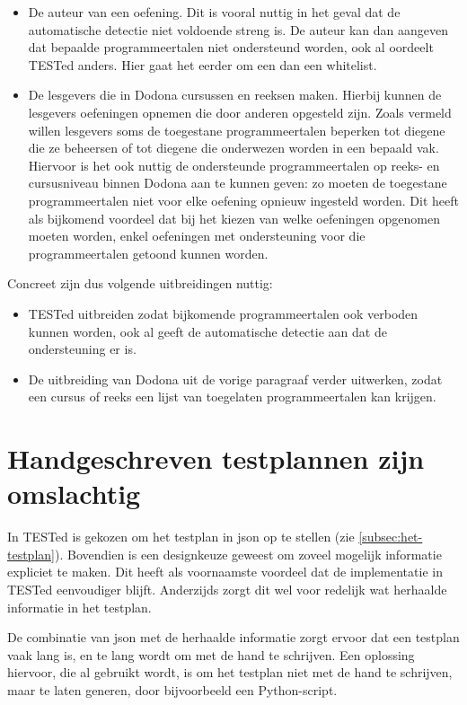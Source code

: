 \begin{itemize}
    \item De auteur van een oefening.
    Dit is vooral nuttig in het geval dat de automatische detectie niet voldoende streng is.
    De auteur kan dan aangeven dat bepaalde programmeertalen niet ondersteund worden, ook al oordeelt TESTed anders.
    Hier gaat het eerder om een  dan een whitelist.
    \item De lesgevers die in Dodona cursussen en reeksen maken.
    Hierbij kunnen de lesgevers oefeningen opnemen die door anderen opgesteld zijn.
    Zoals vermeld willen lesgevers soms de toegestane programmeertalen beperken tot diegene die ze beheersen of tot diegene die onderwezen worden in een bepaald vak.
    Hiervoor is het ook nuttig de ondersteunde programmeertalen op reeks- en cursusniveau binnen Dodona aan te kunnen geven: zo moeten de toegestane programmeertalen niet voor elke oefening opnieuw ingesteld worden.
    Dit heeft als bijkomend voordeel dat bij het kiezen van welke oefeningen opgenomen moeten worden, enkel oefeningen met ondersteuning voor die programmeertalen getoond kunnen worden.
\end{itemize}

Concreet zijn dus volgende uitbreidingen nuttig:
\begin{itemize}
    \item TESTed uitbreiden zodat bijkomende programmeertalen ook verboden kunnen worden, ook al geeft de automatische detectie aan dat de ondersteuning er is.
    \item De uitbreiding van Dodona uit de vorige paragraaf verder uitwerken, zodat een cursus of reeks een lijst van toegelaten programmeertalen kan krijgen.
\end{itemize}

\section{Handgeschreven testplannen zijn omslachtig}\label{sec:artisanale-testplannen-zijn-omslachtig}

In TESTed is gekozen om het testplan in json op te stellen (zie \cref{subsec:het-testplan}).
Bovendien is een designkeuze geweest om zoveel mogelijk informatie expliciet te maken.
Dit heeft als voornaamste voordeel dat de implementatie in TESTed eenvoudiger blijft.
Anderzijds zorgt dit wel voor redelijk wat herhaalde informatie in het testplan.

De combinatie van json met de herhaalde informatie zorgt ervoor dat een testplan vaak lang is, en te lang wordt om met de hand te schrijven.
Een oplossing hiervoor, die al gebruikt wordt, is om het testplan niet met de hand te schrijven, maar te laten generen, door bijvoorbeeld een Python-script.

